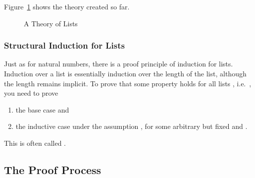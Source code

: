 \begin{isabellebody}
\begin{isamarkuptext}
Figure~\ref{fig:MyList} shows the theory created so far.

\begin{figure}[htbp]
\begin{alltt}
\end{alltt}
\caption{A Theory of Lists}
\label{fig:MyList}
\end{figure}

\subsubsection{Structural Induction for Lists}

Just as for natural numbers, there is a proof principle of induction for
lists. Induction over a list is essentially induction over the length of
the list, although the length remains implicit. To prove that some property
 holds for all lists , i.e.\ \mbox{},
you need to prove
\begin{enumerate}
\item the base case  and
\item the inductive case  under the assumption , for some arbitrary but fixed  and .
\end{enumerate}
This is often called .

\subsection{The Proof Process}


\end{isamarkuptext}
\end{isabellebody}
